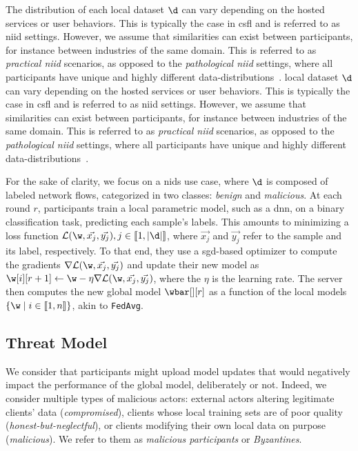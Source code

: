 The distribution of each local dataset $\d$ can vary depending on the hosted services or user behaviors.
This is typically the case in \gls{csfl} and is referred to as \gls{niid} settings. 
However, we assume that similarities can exist between participants, for instance between industries of the same domain.
This is referred to as \emph{practical \gls{niid}} scenarios, as opposed to the \emph{pathological \gls{niid}} settings, where all participants have unique and highly different data-distributions~\cite{huang_personalizedcrosssilofederated_2021}.
 local dataset $\d$ can vary depending on the hosted services or user behaviors.
This is typically the case in \gls{csfl} and is referred to as \gls{niid} settings. 
However, we assume that similarities can exist between participants, for instance between industries of the same domain.
This is referred to as \emph{practical \gls{niid}} scenarios, as opposed to the \emph{pathological \gls{niid}} settings, where all participants have unique and highly different data-distributions~\cite{huang_personalizedcrosssilofederated_2021}.

For the sake of clarity, we focus on a \gls{nids} use case, where $\d$ is composed of labeled network flows, categorized in two classes: \emph{benign} and \emph{malicious}.
At each round $r$, participants train a local parametric model, such as a \gls{dnn}, on a binary classification task, \ie predicting each sample's labels.
This amounts to minimizing a loss function $\mathcal{L}(\w, \Vec{x_j}, \Vec{y_j}), j \in \llbracket 1, |\d| \rrbracket $, where $\Vec{x_j}$ and $\Vec{y_j}$ refer to the sample and its label, respectively.
To that end, they use a \gls{sgd}-based optimizer to compute the gradients $\nabla \mathcal{L}(\w, \Vec{x_j}, \Vec{y_j})$ and update their new model as $\w[i][r+1] \gets \w - \eta \nabla \mathcal{L}(\w, \Vec{x_j}, \Vec{y_j})$, where the $\eta$ is the learning rate.
The server then computes the new global model $\wbar[][r]$ as a function of the local models $\{\w \mid i\in \llbracket 1,n \rrbracket\}$, akin to \texttt{FedAvg}.  




\subsection{Threat Model}
\label{sec:problem.threat}

We consider that participants might upload model updates that would negatively impact the performance of the global model, deliberately or not.
%
Indeed, we consider multiple types of malicious actors: external actors altering legitimate clients' data (\ie \emph{compromised}), clients whose local training sets are of poor quality (\ie \emph{honest-but-neglectful}), or clients modifying their own local data on purpose (\ie \emph{malicious}).
We refer to them as \emph{malicious participants} or \emph{Byzantines}.

